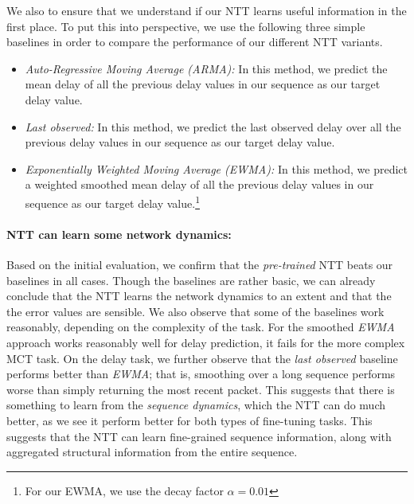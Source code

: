 We also to ensure that we understand if our NTT learns useful information in the first place. To put this into perspective, we use the following three simple baselines in order to compare the performance of our different NTT variants. 
\begin{itemize}
\item \emph{Auto-Regressive Moving Average (ARMA)\cite{arma}:} In this method, we predict the mean delay of all the previous delay values in our sequence as our target delay value.
\item \emph{Last observed:} In this method, we predict the last observed delay over all the previous delay values in our sequence as our target delay value.
\item \emph{Exponentially Weighted Moving Average (EWMA)\cite{ewma}:}  In this method, we predict a weighted smoothed mean delay of all the previous delay values in our sequence as our target delay value.\footnote{For our EWMA, we use the decay factor $\alpha=0.01$} 
\end{itemize}

\paragraph*{NTT can learn some network dynamics:}

Based on the initial evaluation, we confirm that the \emph{pre-trained} NTT beats our baselines in all cases. Though the baselines are rather basic, we can already conclude that the NTT learns the network dynamics to an extent and that the 
the error values are sensible. We also observe that some of the baselines work reasonably, depending on the complexity of the task. For \eg the smoothed \emph{EWMA} approach works reasonably well for delay prediction, it fails for the more complex MCT task.
On the delay task, we further observe that the \emph{last observed} baseline performs better than \emph{EWMA}; that is, smoothing over a long sequence performs worse than simply returning the most recent packet.
This suggests that there is something to learn from the \emph{sequence dynamics}, which the NTT can do much better, as we see it perform better for both types of fine-tuning tasks. This suggests that the NTT can learn fine-grained sequence information, along with aggregated structural information from the entire sequence.

